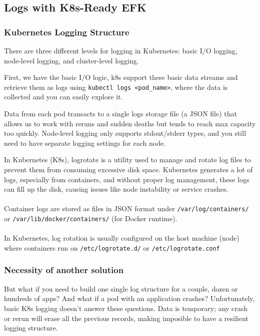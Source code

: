 \documentclass{article}
\newenvironment{blocktemplate}[1]{%
    \tcolorbox[beamer,%
    noparskip,breakable,
    colframe=Blue,%
    colbacklower=LimeGreen!75!LightGreen,%
    title=#1]}%
    {\endtcolorbox}
\begin{document}
\subsection{Logs with K8s-Ready EFK}

\subsubsection{Kubernetes Logging Structure}
There are three different levels for logging in Kubernetes: basic I/O logging, node-level logging, and cluster-level logging.

First, we have the basic I/O logic, k8s support these basic data streams and retrieve them as logs using \verb|kubectl logs <pod_name>|, where the data is collected and you can easily explore it.

Data from each pod transacts to a single logs storage file (a JSON file)
that allows us to work with reruns and sudden deaths but tends 
to reach max capacity too quickly. 
Node-level logging only supports stdout/stderr types, 
and you still need to have separate logging settings for each node.

\begin{blocktemplate}{Note}
In Kubernetes (K8s), logrotate is a utility used to manage and rotate log files to prevent them from consuming excessive disk space. Kubernetes generates a lot of logs, especially from containers, and without proper log management, these logs can fill up the disk, causing issues like node instability or service crashes.
\\\\
Container logs are stored as files in JSON format under \verb|/var/log/containers/| or \verb|/var/lib/docker/containers/| (for Docker runtime).
\\\\
In Kubernetes, log rotation is usually configured on the host machine (node) where containers run on \verb|/etc/logrotate.d/| or \verb|/etc/logrotate.conf| 
\end{blocktemplate}

\subsubsection{Necessity of another solution}

But what if you need to build one single log structure for a couple, dozen or hundreds of apps? And what if a pod with an application crashes? 
Unfortunately, basic K8s logging doesn't answer these questions. 
Data is temporary; any crash or rerun will erase all the previous records, making imposible to have a resilient logging structure.
\end{document}

